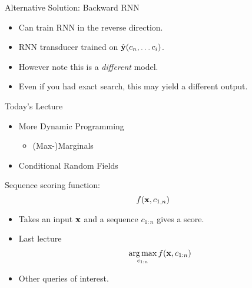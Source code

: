 \documentclass{beamer}
\def\Lattice{
    \matrix (network)
    [matrix of nodes,
    nodes in empty cells,
    ampersand replacement=\&,
    column sep={1cm},
    row sep={0.1cm},
    nodes={outer sep=0pt,circle,minimum size=0.5cm, minimum width=1.3cm,draw, rectangle} ]
    {
     O \& O \& O \& O \& O\\
     I-PER \& I-PER \& I-PER \& I-PER \& I-PER \\ 
     I-ORG \& I-ORG \& I-ORG \& I-ORG \& I-ORG \\ 
     I-LOC \& I-LOC \& I-LOC \& I-LOC \& I-LOC \\ 
     |[draw=none]| \\
     |[draw=none]| Mayor \& |[draw=none]| DeBlasio \& |[draw=none]| from \& |[draw=none]| New  \& |[draw=none]| York  \\  
};
}
\begin{document}
\begin{frame}{Alternative Solution: Backward RNN}
  \begin{itemize}
  \item Can train RNN in the reverse direction.
    \air
  \item RNN transducer trained on $\hat{\mathbf{y}}(c_n, \ldots c_i)$.
    \air 
  \item However note this is a \textit{different} model. 
    \air
  \item Even if you had exact search, this may yield a different output.
  \end{itemize}
\end{frame}


\begin{frame}{Today's Lecture}
  \begin{itemize}
  \item More Dynamic Programming
    \begin{itemize}
    \item (Max-)Marginals
    \end{itemize}
  \item Conditional Random Fields
  \end{itemize}
\end{frame}


\begin{frame}{}
  Sequence scoring function: 
  \[ f(\mathbf{x}, c_{1, n}) \] 

  \begin{itemize}
  \item Takes an input $\mathbf{x}$ and a sequence $c_{1:n}$ gives a score.
    \air 
  \item Last lecture \[ \argmax_{c_{1:n}} f(\boldx, c_{1:n}) \]
    \air
  \item Other queries of interest. 
   
  \end{itemize}
\end{frame}

\end{document}
